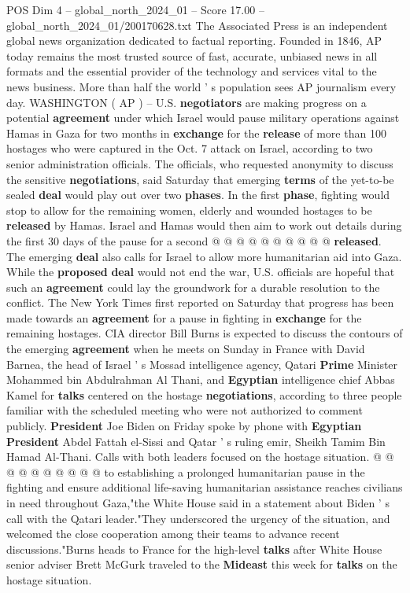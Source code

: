 \begin{textsample}{POS Dim 4 – global\_north\_2024\_01 – Score 17.00 – global\_north\_2024\_01/200170628.txt}  \label{ex:f4_pos_349}
The Associated Press is an independent global news organization dedicated to factual reporting.
Founded in 1846, AP today remains the most trusted source of fast, accurate, unbiased news in all formats and the essential provider of the technology and services vital to the news business.
More than half the world ' s population sees AP journalism every day.
WASHINGTON ( AP ) -- U.S. \textbf{negotiators} are making progress on a potential \textbf{agreement} under which Israel would pause military operations against Hamas in Gaza for two months in \textbf{exchange} for the \textbf{release} of more than 100 hostages who were captured in the Oct. 7 attack on Israel, according to two senior administration officials.
The officials, who requested anonymity to discuss the sensitive \textbf{negotiations}, said Saturday that emerging \textbf{terms} of the yet-to-be sealed \textbf{deal} would play out over two \textbf{phases}.
In the first \textbf{phase}, fighting would stop to allow for the remaining women, elderly and wounded hostages to be \textbf{released} by Hamas.
Israel and Hamas would then aim to work out details during the first 30 days of the pause for a second @ @ @ @ @ @ @ @ @ @ \textbf{released}.
The emerging \textbf{deal} also calls for Israel to allow more humanitarian aid into Gaza.
While the \textbf{proposed} \textbf{deal} would not end the war, U.S. officials are hopeful that such an \textbf{agreement} could lay the groundwork for a durable resolution to the conflict.
The New York Times first reported on Saturday that progress has been made towards an \textbf{agreement} for a pause in fighting in \textbf{exchange} for the remaining hostages.
CIA director Bill Burns is expected to discuss the contours of the emerging \textbf{agreement} when he meets on Sunday in France with David Barnea, the head of Israel ' s Mossad intelligence agency, Qatari \textbf{Prime} Minister Mohammed bin Abdulrahman Al Thani, and \textbf{Egyptian} intelligence chief Abbas Kamel for \textbf{talks} centered on the hostage \textbf{negotiations}, according to three people familiar with the scheduled meeting who were not authorized to comment publicly. \textbf{President} Joe Biden on Friday spoke by phone with \textbf{Egyptian} \textbf{President} Abdel Fattah el-Sissi and Qatar ' s ruling emir, Sheikh Tamim Bin Hamad Al-Thani.
Calls with both leaders focused on the hostage situation. @ @ @ @ @ @ @ @ @ @ to establishing a prolonged humanitarian pause in the fighting and ensure additional life-saving humanitarian assistance reaches civilians in need throughout Gaza,"the White House said in a statement about Biden ' s call with the Qatari leader."They underscored the urgency of the situation, and welcomed the close cooperation among their teams to advance recent discussions."Burns heads to France for the high-level \textbf{talks} after White House senior adviser Brett McGurk traveled to the \textbf{Mideast} this week for \textbf{talks} on the hostage situation.

\end{textsample}
